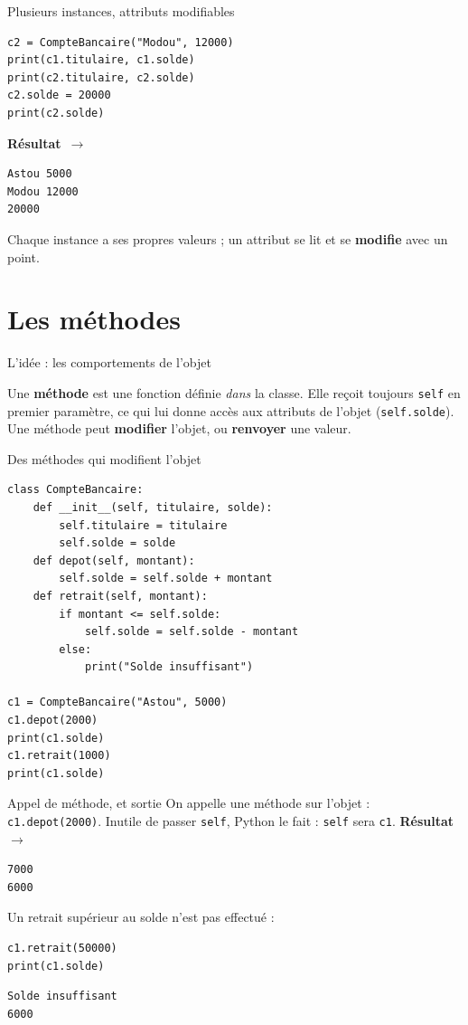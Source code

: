 \documentclass[aspectratio=169,11pt]{beamer}
\newcommand{\resultat}{{\scriptsize\textbf{R\'esultat}~$\rightarrow$}\par\vspace{1pt}}
\begin{document}
\begin{frame}[fragile]{Plusieurs instances, attributs modifiables}
\begin{lstlisting}
c2 = CompteBancaire("Modou", 12000)
print(c1.titulaire, c1.solde)
print(c2.titulaire, c2.solde)
c2.solde = 20000
print(c2.solde)
\end{lstlisting}
\resultat
\begin{lstlisting}[style=out]
Astou 5000
Modou 12000
20000
\end{lstlisting}
{\small Chaque instance a ses propres valeurs ; un attribut se lit et se \textbf{modifie} avec un point.}
\end{frame}

\section{Les méthodes}

\begin{frame}{L'idée : les comportements de l'objet}
\begin{ucaddef}
{\small Une \textbf{méthode} est une fonction définie \emph{dans} la classe. Elle reçoit toujours \texttt{self} en premier paramètre, ce qui lui donne accès aux attributs de l'objet (\texttt{self.solde}). Une méthode peut \textbf{modifier} l'objet, ou \textbf{renvoyer} une valeur.}
\end{ucaddef}
\end{frame}

\begin{frame}[fragile]{Des méthodes qui modifient l'objet}
\begin{lstlisting}
class CompteBancaire:
    def __init__(self, titulaire, solde):
        self.titulaire = titulaire
        self.solde = solde
    def depot(self, montant):
        self.solde = self.solde + montant
    def retrait(self, montant):
        if montant <= self.solde:
            self.solde = self.solde - montant
        else:
            print("Solde insuffisant")

c1 = CompteBancaire("Astou", 5000)
c1.depot(2000)
print(c1.solde)
c1.retrait(1000)
print(c1.solde)
\end{lstlisting}
\end{frame}

\begin{frame}[fragile]{Appel de méthode, et sortie}
{\small On appelle une méthode sur l'objet : \texttt{c1.depot(2000)}. Inutile de passer \texttt{self}, Python le fait : \texttt{self} sera \texttt{c1}.}
\resultat
\begin{lstlisting}[style=out]
7000
6000
\end{lstlisting}
{\small Un retrait supérieur au solde n'est pas effectué :}
\begin{lstlisting}
c1.retrait(50000)
print(c1.solde)
\end{lstlisting}
\begin{lstlisting}[style=out]
Solde insuffisant
6000
\end{lstlisting}
\end{frame}
\end{document}
